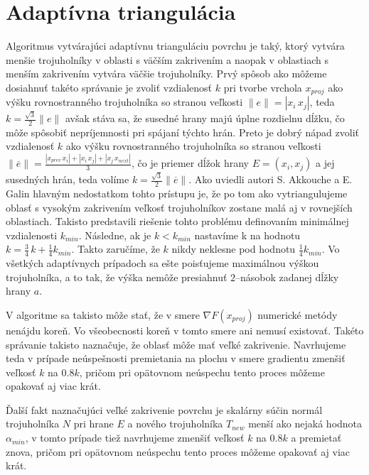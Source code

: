 \section{Adaptívna triangulácia}

Algoritmus vytvárajúci adaptívnu trianguláciu povrchu je taký, ktorý vytvára menšie trojuholníky v oblasti 
s väčším zakrivením a naopak v oblastiach s menším zakrivením vytvára väčšie trojuholníky.
Prvý spôsob ako môžeme dosiahnuť takéto správanie je zvoliť vzdialenosť $k$ pri tvorbe vrchola $x_{proj}$
ako výšku rovnostranného trojuholníka so stranou veľkosti $\|e\| = | x_i \, x_j |$, teda 
$k=\frac{\sqrt 3}{2} \| e \|$ avšak stáva sa, že susedné
hrany majú úplne rozdielnu dĺžku, čo môže spôsobiť nepríjemnosti pri spájaní týchto hrán. 
Preto je dobrý nápad zvoliť vzdialenosť $k$ ako výšku rovnostranného trojuholníka so stranou veľkosti
$\| \overline{e} \| = \frac{| x_{prev} \, x_i | + | x_i \, x_j | + | x_j \, x_{next} |}{3}$, čo je 
priemer dĺžok hrany
$E = (x_i, x_j)$ a jej susedných hrán, teda volíme $k=\frac{\sqrt 3}{2} \| \overline{e} \|$. 
Ako uviedli autori S. Akkouche a E. Galin \cite{akkouche2001adaptive}
hlavným nedostatkom tohto prístupu je, že po tom ako vytriangulujeme oblasť s vysokým zakrivením 
veľkosť trojuholníkov zostane malá aj v rovnejších oblastiach. Takisto predstavili riešenie tohto 
problému definovaním minimálnej vzdialenosti $k_{min}$. Následne, ak je $k < k_{min}$ 
nastavíme k na hodnotu $k = \frac{3}{4} \, k + \frac{1}{4} k_{min}$. Takto zaručíme, že $k$ nikdy neklesne
pod hodnotu $\frac{1}{4} k_{min}$. 
Vo všetkých adaptívnych prípadoch sa ešte poisťujeme maximálnou výškou trojuholníka, a to tak, že
výška nemôže presiahnuť $2$--násobok zadanej dĺžky hrany $a$.

V algoritme sa takisto môže stať, že v smere $\nabla F(x_{proj})$ numerické metódy nenájdu koreň. 
Vo všeobecnosti koreň v tomto smere ani nemusí existovať. Takéto správanie takisto naznačuje, že oblasť
môže mať veľké zakrivenie. Navrhujeme teda v prípade neúspešnosti premietania na plochu v smere gradientu 
zmenšiť veľkosť $k$ na $0.8 k$, pričom pri opätovnom neúspechu tento proces môžeme opakovať aj viac 
krát. 

Ďalší fakt naznačujúci veľké zakrivenie povrchu je skalárny súčin normál trojuholníka $N$ pri hrane $E$
a nového trojuholníka $T_{new}$ menší ako nejaká hodnota $\alpha_{min}$, v tomto prípade tiež navrhujeme
zmenšiť veľkosť $k$ na $0.8 k$ a premietať znova, pričom pri opätovnom neúspechu tento proces 
môžeme opakovať aj viac krát.

